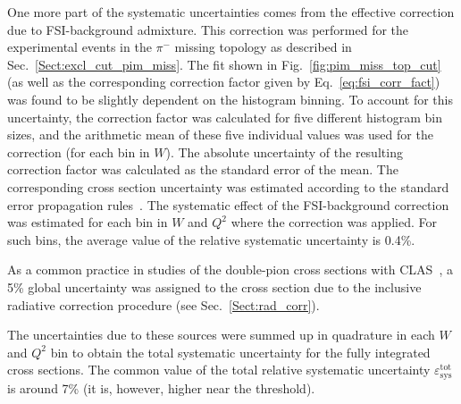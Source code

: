\documentclass[prc,twocolumn,superscriptaddress,showpacs,amssymb,amsmath,amsfonts,aps,nofootinbib]{revtex4-1}
\begin{document}

One more part of the systematic uncertainties comes from the effective correction due to FSI-background admixture. This correction was performed for the experimental events in the $\pi^{-}$ missing topology as described in Sec.\!~\ref{Sect:excl_cut_pim_miss}. The fit shown in Fig.\!~\ref{fig:pim_miss_top_cut} (as well as the corresponding correction factor given by Eq.\!~\eqref{eq:fsi_corr_fact}) was found to be slightly dependent on the histogram binning. To account for this uncertainty, the correction factor was calculated for five different histogram bin sizes, and the arithmetic mean of these five individual values was used for the correction (for each bin in $W$). The absolute uncertainty of the resulting correction factor was calculated as the standard error of the mean. The corresponding cross section uncertainty was estimated according to the standard error propagation rules~\cite{my_an_note:2020, my_thesis:2021}. The systematic effect of the FSI-background correction was estimated for each bin in $W$ and $Q^{2}$ where the correction was applied. For such bins, the average value of the relative systematic uncertainty is 0.4\%.




As a common practice in studies of the double-pion cross sections with CLAS~\cite{Rip_an_note:2002,Ripani:2002ss,Fed_an_note:2007,Fedotov:2008aa,Isupov:2017lnd,Arjun,Fed_an_note:2017,Fed_paper_2018}, a 5\% global uncertainty was assigned to the cross section due to the inclusive radiative correction procedure (see Sec.\!~\ref{Sect:rad_corr}).



The uncertainties due to these sources were summed up in quadrature in each $W$ and $Q^{2}$ bin to obtain the total systematic uncertainty for the fully integrated cross sections. The common value of the total relative systematic uncertainty $\varepsilon_{\text{sys}}^{\text{tot}}$ is around 7\% (it is, however, higher near the threshold).
\end{document}
